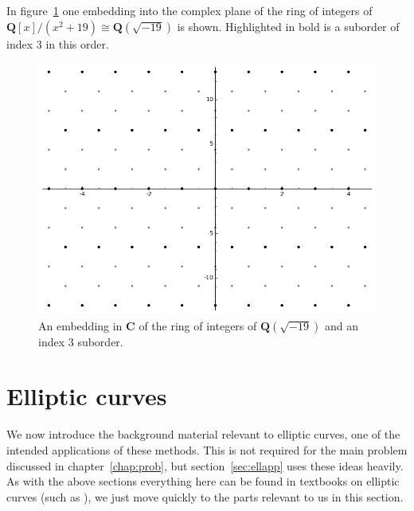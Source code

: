 \documentclass[a4paper,abstracton,bibtotoc]{scrreprt}
\theoremstyle{definition}
\newcommand{\QQ}{\mathbf{Q}}
\newcommand{\CC}{\mathbf{C}}
\begin{document}
In figure~\ref{fig:sageord} one embedding into the complex plane of the ring of integers of $\QQ[x]/(x^2 + 19)\cong \QQ(\sqrt{-19})$ is shown.
Highlighted in bold is a suborder of index 3 in this order.
\begin{figure}
\centering
\includegraphics[scale=0.6]{sageord}
\caption{\label{fig:sageord} An embedding in $\CC$ of the ring of integers of $\QQ(\sqrt{-19})$ and an index 3 suborder.}
\end{figure}

%


\section{Elliptic curves}
\label{sec:ell}

We now introduce the background material relevant to elliptic curves, one of the intended applications of these methods.
This is not required for the main problem discussed in chapter~\ref{chap:prob}, but section~\ref{sec:ellapp} uses these ideas heavily.
As with the above sections everything here can be found in textbooks on elliptic curves (such as \cite{knapp}), we just move quickly to the parts relevant to us in this section.
\end{document}
